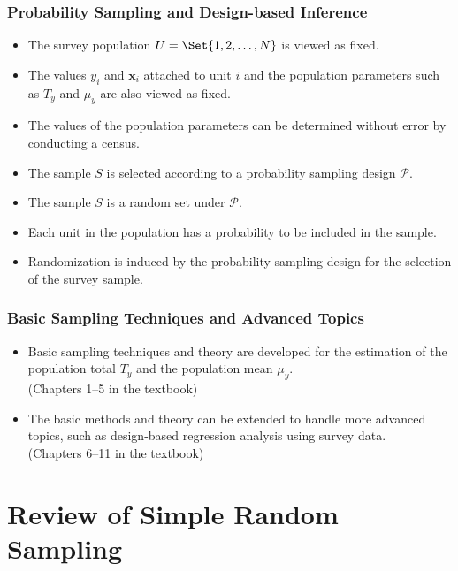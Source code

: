 \documentclass[oneside]{book}\usepackage[]{graphicx}\usepackage[svgnames]{xcolor}
\providecommand{\Vector}[1]{\bm{#1}}%
\begin{document}
\subsection*{Probability Sampling and Design-based Inference}
\begin{Regular}{}
      \begin{itemize}
            \item The survey population $ U=\Set{1,2,\ldots,N} $ is viewed as fixed.
            \item The values $ y_i $ and $ \Vector{x}_i $ attached to unit $ i $
                  and the population parameters such as $ T_y $ and $ \mu_y $
                  are also viewed as fixed.
            \item The values of the population parameters can be determined without error by conducting
                  a census.
            \item The sample $ S $ is selected according to a probability sampling design $ \mathcal{P} $.
            \item The sample $ S $ is a random set under $ \mathcal{P} $.
            \item Each unit in the population has a probability to be included in the
                  sample.
            \item Randomization is induced by the probability sampling design for
                  the selection of the survey sample.
      \end{itemize}
\end{Regular}
\subsection*{Basic Sampling Techniques and Advanced Topics}
\begin{itemize}
      \item Basic sampling techniques and theory are developed for the
            estimation of the population total $T_y$ and the population mean $ \mu_y $.\\
            (Chapters 1--5 in the textbook)
      \item The basic methods and theory can be extended to handle more
            advanced topics, such as design-based regression analysis using
            survey data.\\
            (Chapters 6--11 in the textbook)
\end{itemize}
\chapter{Review of Simple Random Sampling}
\end{document}
